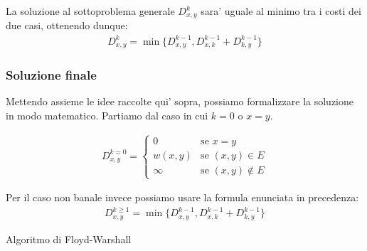 \documentclass{article}
\begin{document}
La soluzione al sottoproblema generale $D_{x,y}^k$ sara' uguale al minimo tra i
costi dei due casi, ottenendo dunque:
\begin{align*}
  D_{x,y}^k = \min \{ D_{x,y}^{k-1}, D_{x,k}^{k-1} + D_{k,y}^{k-1} \}
\end{align*}

\subsubsection{Soluzione finale}

Mettendo assieme le idee raccolte qui' sopra, possiamo formalizzare la soluzione
in modo matematico. Partiamo dal caso in cui $k = 0$ o $x = y$.

\begin{align*}
  D_{x,y}^{k=0} = \begin{cases}
    0 &\text{se } x = y \\
    w(x, y) &\text{se } (x, y) \in E \\
    \infty &\text{se } (x, y) \not\in E
  \end{cases}
\end{align*}

Per il caso non banale invece possiamo usare la formula enunciata in precedenza:
\begin{align*}
  D_{x,y}^{k\geq1} = \min \{ D_{x,y}^{k-1}, D_{x,k}^{k-1} + D_{k,y}^{k-1} \}
\end{align*}

\begin{algorithm}[H]
  \caption{Algoritmo di Floyd-Warshall}
\end{algorithm}
\end{document}
